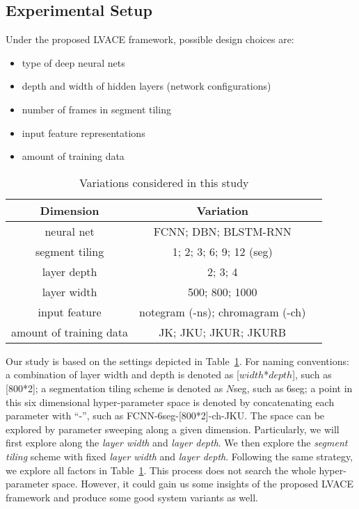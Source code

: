 \subsection{Experimental Setup}
Under the proposed LVACE framework, possible design choices are:
\begin{itemize}
	\item type of deep neural nets
	\item depth and width of hidden layers (network configurations)
	\item number of frames in segment tiling
	\item input feature representations
	\item amount of training data
\end{itemize}

\begin{table}[h!]
	\caption{Variations considered in this study}
	\centering
	\footnotesize
	\begin{tabular}{|c|c|c|} \hline
		Dimension & Variation \\ \hline
		neural net & FCNN; DBN; BLSTM-RNN \\ \hline
		segment tiling & 1; 2; 3; 6; 9; 12 (seg) \\ \hline
		layer depth & 2; 3; 4 \\ \hline
		layer width & 500; 800; 1000 \\ \hline
		input feature & notegram (-ns); chromagram (-ch) \\ \hline
		amount of training data & JK; JKU; JKUR; JKURB \\ \hline
	\end{tabular}
	\label{tab:3-varexplore}
\end{table}

Our study is based on the settings depicted in Table~\ref{tab:3-varexplore}. For naming conventions: a combination of layer width and depth is denoted as [$width$*$depth$], such as [800*2]; a segmentation tiling scheme is denoted as $N$seg, such as 6seg; a point in this six dimensional hyper-parameter space is denoted by concatenating each parameter with ``-'', such as FCNN-6seg-[800*2]-ch-JKU. The space can be explored by parameter sweeping along a given dimension. Particularly, we will first explore along the {\it layer width} and {\it layer depth}. We then explore the \textit{segment tiling} scheme with fixed {\it layer width} and {\it layer depth}. Following the same strategy, we explore all factors in Table~\ref{tab:3-varexplore}. This process does not search the whole hyper-parameter space. However, it could gain us some insights of the proposed LVACE framework and produce some good system variants as well.

